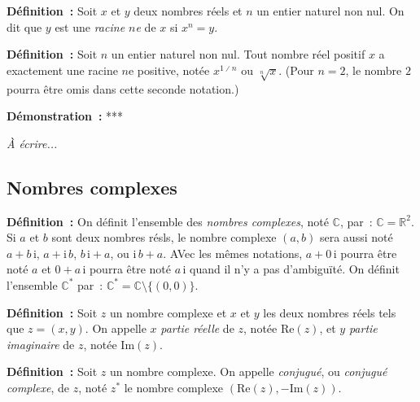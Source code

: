 \medskip

\noindent\textbf{Définition :} Soit $x$ et $y$ deux nombres réels et $n$ un entier naturel non nul.
    On dit que $y$ est une \emph{racine $n$e} de $x$ si $x^n = y$.

\medskip

\noindent\textbf{Définition :} Soit $n$ un entier naturel non nul. 
    Tout nombre réel positif $x$ a exactement une racine $n$e positive, notée $x^{1 \divslash n}$ ou $\sqrt[n]{x}$.
    (Pour $n = 2$, le nombre $2$ pourra être omis dans cette seconde notation.)

\medskip

\noindent\textbf{Démonstration :} ***

\medskip

\emph{À écrire...}

\subsection{Nombres complexes}

\noindent\textbf{Définition :} 
    On définit l'ensemble des \emph{nombres complexes}, noté $\mathbb{C}$, par : $\mathbb{C} = \mathbb{R}^2$.
    Si $a$ et $b$ sont deux nombres résls, le nombre complexe $(a, b)$ sera aussi noté $a + b \, \mathrm{i}$, $a + \mathrm{i} \, b$, $b \, \mathrm{i} + a$, ou $\mathrm{i} \, b + a$.
    AVec les mêmes notations, $a + 0 \, \mathrm{i}$ pourra être noté $a$ et $0 + a \, \mathrm{i}$ pourra être noté $a \, \mathrm{i}$ quand il n'y a pas d'ambiguïté.
    On définit l'ensemble $\mathbb{C}^*$ par : $\mathbb{C}^* = \mathbb{C} \setminus \lbrace (0, 0) \rbrace$.

\medskip

\noindent\textbf{Définition :}   
    Soit $z$ un nombre complexe et $x$ et $y$ les deux nombres réels tels que $z = (x, y)$.
    On appelle $x$ \emph{partie réelle} de $z$, notée $\mathrm{Re}(z)$, et $y$ \emph{partie imaginaire} de $z$, notée $\mathrm{Im}(z)$.

\medskip

\noindent\textbf{Définition :}  \sindex[isy]{$*$}
    Soit $z$ un nombre complexe.
    On appelle \emph{conjugué}, ou \emph{conjugué complexe}, de $z$, noté $z^*$ le nombre complexe $\left( \mathrm{Re}(z), - \mathrm{Im}(z) \right)$.

\medskip

